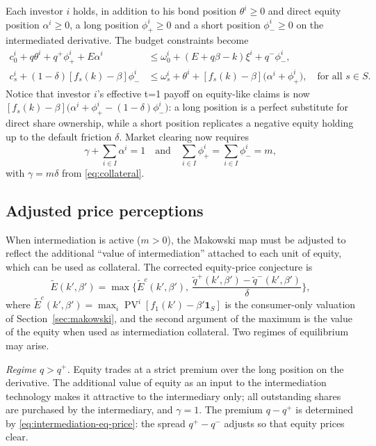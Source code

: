 \documentclass[11pt,a4paper,oneside]{book}
\def\1{\mathbf{1}}
\def\leq{\leqslant}
\def\geq{\geqslant}
\def\et{\quad \text{and} \quad}
\DeclareMathOperator{\PV}{PV}
\theoremstyle{plain}
\theoremstyle{definition}
\theoremstyle{remark}
\numberwithin{equation}{chapter}
\begin{document}
Each investor $i$ holds, in addition to his bond position $\theta^i \geq 0$ and direct equity position $\alpha^i \geq 0$, a long position $\phi^i_+ \geq 0$ and a short position $\phi^i_- \geq 0$ on the intermediated derivative.
The budget constraints become
\begin{align}
  c^i_0 + q \theta^i + q^+ \phi^i_+ + E \alpha^i
  &\leq
  \omega^i_0 + (E + q \beta - k) \xi^i + q^- \phi^i_-,
  \label{eq:budget-0-int}\\[2pt]
  c^i_s + (1 - \delta) [f_s(k) - \beta] \phi^i_-
  &\leq
  \omega^i_s + \theta^i + [f_s(k) - \beta] \bigl( \alpha^i + \phi^i_+ \bigr),
  \quad \text{for all $s\in S$}.
  \label{eq:budget-s-int}
\end{align}
Notice that investor $i$'s effective t=1 payoff on equity-like claims is now $[f_s(k) - \beta] \bigl( \alpha^i + \phi^i_+ - (1-\delta) \phi^i_- \bigr)$: a long position is a perfect substitute for direct share ownership, while a short position replicates a negative equity holding up to the default friction $\delta$.
Market clearing now requires
\begin{equation*}
  \gamma + \sum_{i \in I} \alpha^i = 1
  \et
  \sum_{i \in I} \phi^i_+ = \sum_{i \in I} \phi^i_- = m,
\end{equation*}
with $\gamma = m \delta$ from \eqref{eq:collateral}.

\subsection{Adjusted price perceptions}

When intermediation is active ($m > 0$), the Makowski map must be adjusted to reflect the additional ``value of intermediation'' attached to each unit of equity, which can be used as collateral.
The corrected equity-price conjecture is
\begin{equation}\label{eq:makowski-intermediation}
  \widetilde{E}(k', \beta')
  =
  \max \Biggl\{
  \widetilde{E}^c(k', \beta'),
  \ \frac{\widetilde{q}^+(k', \beta') - \widetilde{q}^-(k', \beta')}{\delta}
  \Biggr\},
\end{equation}
where $\widetilde{E}^c(k', \beta') = \max_i \PV^i[f_1(k') - \beta' \1_S]$ is the consumer-only valuation of Section~\ref{sec:makowski}, and the second argument of the maximum is the value of the equity when used as intermediation collateral.
Two regimes of equilibrium may arise.

\emph{Regime $q > q^+$.}
Equity trades at a strict premium over the long position on the derivative.
The additional value of equity as an input to the intermediation technology makes it attractive to the intermediary only; all outstanding shares are purchased by the intermediary, and $\gamma = 1$.
The premium $q - q^+$ is determined by \eqref{eq:intermediation-eq-price}: the spread $q^+ - q^-$ adjusts so that equity prices clear.
\end{document}

